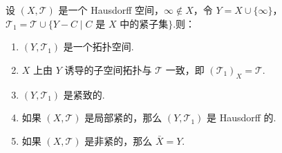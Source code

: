 \begin{theorem}
    设 $(X, \mathcal{T})$ 是一个 Hausdorff 空间，$\infty \notin X$，令 $Y = X \cup \{\infty\}$，$\mathcal{T}_1 = \mathcal{T} \cup \{Y-C \mid C \text{ 是 } X \text{ 中的紧子集}\}$.则：
    \begin{enumerate}
        \item $(Y, \mathcal{T}_1)$ 是一个拓扑空间.
        \item $X$ 上由 $Y$ 诱导的子空间拓扑与 $\mathcal{T}$ 一致，即 $(\mathcal{T}_1)_X = \mathcal{T}$.
        \item $(Y, \mathcal{T}_1)$ 是紧致的.
        \item 如果 $(X, \mathcal{T})$ 是局部紧的，那么 $(Y, \mathcal{T}_1)$ 是 Hausdorff 的.
        \item 如果 $(X, \mathcal{T})$ 是非紧的，那么 $\bar{X} = Y$.
    \end{enumerate}
\end{theorem}
